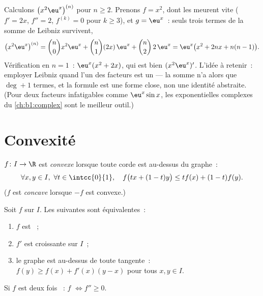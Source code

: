 \begin{example}\label{ex:b1:derivative:leibnizaction}
Calculons $\bigl(x^2 \eu^x\bigr)^{(n)}$ pour $n \geq 2$. Prenons $f =
x^2$, dont les  meurent vite ($f' = 2x$, $f'' = 2$,
$f^{(k)} = 0$ pour $k \geq 3$), et $g = \eu^x$~: seuls trois termes
de la somme de Leibniz survivent,
\[
\bigl(x^2\eu^x\bigr)^{(n)}
= \binom n0 x^2 \eu^x + \binom n1 (2x)\,\eu^x + \binom n2\,
2\,\eu^x
= \eu^x\bigl(x^2 + 2nx + n(n-1)\bigr).
\]
Vérification en $n = 1$~: $\eu^x(x^2 + 2x)$, qui est bien
$(x^2\eu^x)'$. L'idée à retenir~: employer Leibniz quand l'un des facteurs
est un  --- la somme n'a alors que $\deg + 1$ termes, et
la formule est une forme close, non une identité abstraite. (Pour deux
facteurs infatigables comme $\eu^x\sin x$, les exponentielles
complexes du \cref{ch:b1:complex} sont le meilleur outil.)
\end{example}

\section{Convexité}

\begin{definition}\label{def:b1:derivative:convex}
$f \colon I \to \R$ est \emph{convexe} lorsque
toute corde est au-dessus du graphe~:
\[
\forall x, y \in I,\ \forall t \in \intcc{0}{1}, \quad
f\bigl(tx + (1-t)y\bigr) \leq t f(x) + (1-t) f(y).
\]
($f$ est \emph{concave} lorsque $-f$ est convexe.)
\end{definition}

\begin{theorem}\label{thm:b1:derivative:convexchar}
Soit $f$  sur $I$. Les  suivantes sont équivalentes~:
\begin{enumerate}
  \item $f$ est ~;
  \item $f'$ est croissante sur $I$~;
  \item le graphe est au-dessus de toute tangente~: $f(y) \geq f(x) +
        f'(x)(y - x)$ pour tous $x, y \in I$.
\end{enumerate}
Si $f$ est deux fois ~: $f$  $\iff f'' \geq 0$.
\end{theorem}

